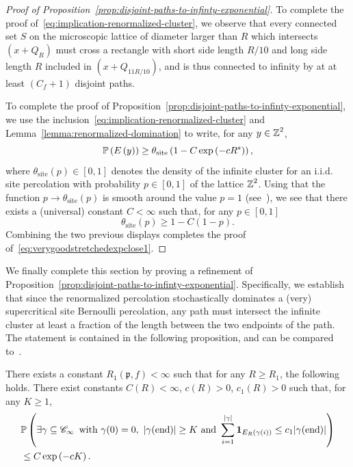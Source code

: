 \documentclass[12pt]{amsart}
\numberwithin{equation}{section}
\begin{document}
\begin{proof}[Proof of Proposition~\ref{prop:disjoint-paths-to-infinty-exponential}]
		
		To complete the proof of~\eqref{eq:implication-renormalized-cluster}, we observe that every connected set $S$ on the microscopic lattice of diameter larger than $R$ which intersects $(x + Q_{R})$ must cross a rectangle with short side length $R/10$ and long side length $R$ included in $(x + Q_{11R/10})$, and is thus connected to infinity by at at least $(C_f + 1)$ disjoint paths.
		
		To complete the proof of Proposition~\ref{prop:disjoint-paths-to-infinty-exponential}, we use the inclusion~\eqref{eq:implication-renormalized-cluster} and Lemma~\ref{lemma:renormalized-domination} to write, for any $y \in \Z^2$,
		\begin{equation*}
			\P \left(  E \left( y \right) \right) \geq \theta_{\mathrm{site}} \left( 1 - C \exp \left( - c R^s \right) \right),
		\end{equation*}
		where $\theta_{\mathrm{site}}(p) \in [0,1]$ denotes the density of the infinite cluster for an i.i.d. site percolation with probability $p \in [0 ,1 ]$ of the lattice $\Z^2$. Using that the function $p \to \theta_{\mathrm{site}}(p)$ is smooth around the value $p = 1$ (see~\cite[Theorem 8.92]{percolation-book}), we see that there exists a (universal) constant $C < \infty$ such that, for any $p \in [0,1]$
		\begin{equation*}
			\theta_{\mathrm{site}}(p) \geq 1-C( 1 - p).
		\end{equation*}
		Combining the two previous displays completes the proof of~\eqref{eq:verygoodstretchedexpclose1}.
	\end{proof}
	
	We finally complete this section by proving a refinement of Proposition~\ref{prop:disjoint-paths-to-infinty-exponential}. Specifically, we establish that since the renormalized percolation stochastically dominates a (very) supercritical site Bernoulli percolation, any path must intersect the infinite cluster at least a fraction of the length between the two endpoints of the path. The statement is contained in the following proposition, and can be compared to~\cite[Lemma 5.3]{mathieu-homogenization}.
	
	\begin{prop}\label{prop:longpathsupercritrenormlatt}
		There exists a constant $R_1(\mathfrak{p},f) < \infty$ such that for any $R \geq R_1$, the following holds. There exist constants $C( R) < \infty$, $c( R) > 0$, $c_1( R) > 0$ such that, for any $K \geq 1$,
		\begin{equation} \label{eq:longpathsupercitrenormlatt}
			\begin{aligned}
				&\P \left( \exists \gamma \subseteq \mathscr{C}_\infty \, \mbox{ with } \gamma(0) = 0,~  \left| \gamma(\mathrm{end}) \right| \geq K ~\mbox{and}~ \sum_{i = 1}^{|\gamma|} \indc_{E_R \left( \gamma(i) \right)} \leq c_1 | \gamma(\mathrm{end}) |  \right)\\
				& \leq C \exp \left( - c K \right).
			\end{aligned}
		\end{equation}
	\end{prop}
	
\end{document}
